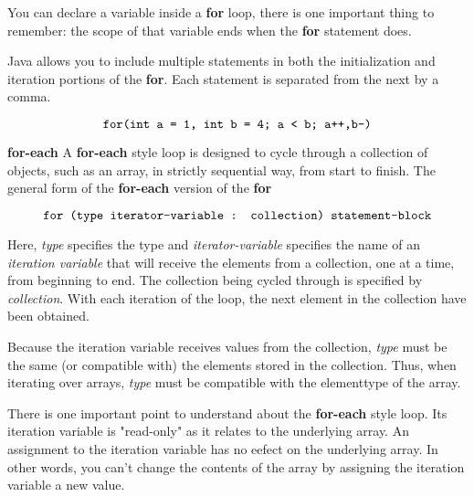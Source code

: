 \vskip 1mm
You can declare a variable inside a {\bf for} loop, there is one important thing to remember: the scope of that variable ends when the {\bf for} statement does.

\vskip 1mm
Java allows you to include multiple statements in both the initialization and iteration portions of the {\bf for}. Each statement is separated from the next by a comma.

$$\hbox{\tt for(int a = 1, int b = 4; a < b; a++,b--)}$$

\vskip 1cm
\filbreak
{\bf for-each}
\vskip 3mm
A {\bf for-each} style loop is designed to cycle through a collection of objects, such as an array, in strictly sequential way, from start to finish. The general form of the {\bf for-each} version of the {\bf for}

$$\hbox{\tt for (type iterator-variable : collection) statement-block}$$

Here, {\it type} specifies the type and {\it iterator-variable} specifies the name of an {\it iteration variable} that will receive the elements from a collection, one at a time, from beginning to end. The collection being cycled through is specified by {\it collection}. With each iteration of the loop, the next element in the collection have been obtained.

\vskip 1mm
Because the iteration variable receives values from the collection, {\it type} must be the same (or compatible with) the elements stored in the collection. Thus, when iterating over arrays, {\it type} must be compatible with the elementtype of the array.

\vskip 1mm
There is one important point to understand about the {\bf for-each} style loop. Its iteration variable is "read-only" as it relates to the underlying array. An assignment to the iteration variable has no eefect on the underlying array. In other words, you can't change the contents of the array by assigning the iteration variable a new value.
\filbreak
\vfill\eject
\bye
